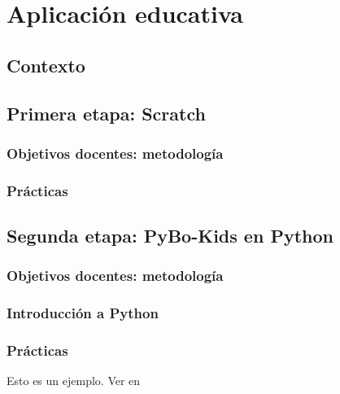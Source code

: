 \chapter{Aplicación educativa}
\label{cap:aplicationEducativa}
\section{Contexto}
\section{Primera etapa: Scratch}
\subsection{Objetivos docentes: metodología}
\subsection{Prácticas}

\section{Segunda etapa: PyBo-Kids en Python}
\subsection{Objetivos docentes: metodología}
\subsection{Introducción a Python}
\subsection{Prácticas}
Esto es un ejemplo. Ver en  \cite{darwin2009origen} \cite{del1984luces}